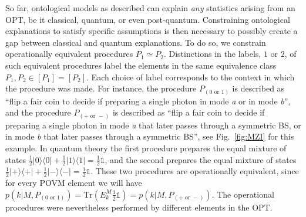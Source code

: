 \documentclass[letterpaper,onecolumn,12pt,accepted=2024-01-17]{article}
\begin{document}
So far, ontological models as described can explain \textit{any} statistics arising from an OPT, be it classical, quantum, or even post-quantum.  Constraining ontological explanations to satisfy specific assumptions is then necessary to possibly create a gap between classical and quantum explanations. To do so, we constrain operationally equivalent procedures $P_1 \simeq P_2$. Distinctions in the labels, $1$ or $2$, of such equivalent procedures label the elements in the same equivalence class $P_1 , P_2 \in [P_1] = [P_2]$. Each choice of label corresponds to the context in which the procedure was made. For instance, the procedure $P_{(0\text{ or }1)}$ is described as ``flip a fair coin to decide if preparing a single photon in mode \textit{a} or in mode \textit{b}'', and the procedure $P_{(+\text{ or }-)}$ is described as ``flip a fair coin to decide if preparing a single photon in mode \textit{a} that later passes through a symmetric BS, or in mode \textit{b} that later passes through a symmetric BS'', see Fig.~\ref{fig:MZI} for this example. In quantum theory the first procedure prepares the equal mixture of states $\frac{1}{2}\vert 0 \rangle \langle 0 \vert + \frac{1}{2}\vert 1 \rangle \langle 1 \vert = \frac{1}{2}\mathbb{1}$, and the second prepares the equal mixture of states $\frac{1}{2}\vert + \rangle \langle + \vert + \frac{1}{2}\vert - \rangle \langle - \vert = \frac{1}{2}\mathbb{1}$. These two procedures are operationally equivalent, since for every POVM element we will have $p(k\vert M, P_{(0\text{ or }1)}) = \text{Tr}(E_k^M \frac{1}{2}\mathbb{1}) = p(k\vert M, P_{(+\text{ or }-)})$. The operational procedures were nevertheless performed by different elements in the OPT. 
\end{document}
